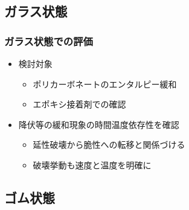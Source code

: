 \documentclass[1４pt, dvipdfmx]{beamer}
\begin{document}
\subsection{ガラス状態}
	\begin{frame}
		\frametitle{ガラス状態での評価}
		\begin{itemize}
			\item 検討対象
			\begin{itemize}
				\item ポリカーボネートのエンタルピー緩和
				\item エポキシ接着剤での確認
			\end{itemize}
			\item 降伏等の緩和現象の時間温度依存性を確認
			\begin{itemize}
				\item 延性破壊から脆性への転移と関係づける
				\item 破壊挙動も速度と温度を明確に
			\end{itemize}
		\end{itemize}
		
	
	\end{frame}
\subsection{ゴム状態}
\end{document}
